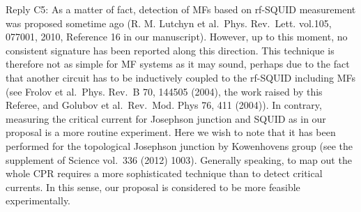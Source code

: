 \documentclass[11pt]{article}
\begin{document}
Reply C5: As a matter of fact, detection of MFs based on rf-SQUID
measurement was proposed sometime ago (R. M. Lutchyn et al.~Phys.
Rev.~Lett. vol.105, 077001, 2010, Reference 16 in our manuscript).
However, up to this moment, no consistent signature has been reported
along this direction. This technique is therefore not as simple for MF
systems as it may sound, perhaps due to the fact that another circuit
has to be inductively coupled to the rf-SQUID including MFs (see Frolov
et al.~Phys. Rev.~B 70, 144505 (2004), the work raised by this Referee,
and Golubov et al.~Rev.~Mod. Phys 76, 411 (2004)). In contrary,
measuring the critical current for Josephson junction and SQUID as in
our proposal is a more routine experiment. Here we wish to note that it
has been performed for the topological Josephson junction by Kowenhovens
group (see the supplement of Science vol.~336 (2012) 1003). Generally
speaking, to map out the whole CPR requires a more sophisticated
technique than to detect critical currents. In this sense, our proposal
is considered to be more feasible experimentally.
\end{document}
